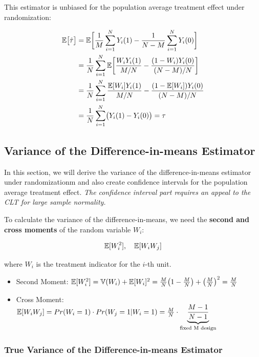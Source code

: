 This estimator is unbiased for the population average treatment effect under randomization:

\begin{align}
    {\mathbb{E}}\bigl[\hat\tau\bigr] &= \mathbb{E}\biggl[\frac{1}{M}\sum_{i=1}^N Y_i(1) - \frac{1}{N-M}\sum_{i=1}^N Y_i(0)\biggr]\\
    &= \frac{1}{N} \sum_{i=1}^N {\mathbb{E}}\biggl[\frac{W_iY_i(1)}{M/N} - \frac{(1-W_i)Y_i(0)}{(N-M)/N}\biggr]\\
    &= \frac{1}{N}\sum_{i=1}^N \frac{{\mathbb{E}}[W_i]Y_i(1)}{M/N} - \frac{(1-{\mathbb{E}}[W_i])Y_i(0)}{(N-M)/N}\\
    &= \frac{1}{N}\sum_{i=1}^N \bigl(Y_i(1) - Y_i(0)\bigr) = \tau
\end{align}


\subsection{Variance of the Difference-in-means Estimator}

In this section, we will derive the variance of the difference-in-means estimator under randomizationm and also create confidence intervals for the population average treatment effect.
\textit{The confidence interval part requires an appeal to the CLT for large sample normality.}

To calculate the variance of the difference-in-means, we need the \textbf{second and cross moments} of the random variable $W_i$:

\begin{align}
    {\mathbb{E}}[W_i^2], \quad {\mathbb{E}}[W_iW_j] 
\end{align}

where $W_i$ is the treatment indicator for the $i$-th unit.

\begin{itemize}
    \item Second Moment: ${\mathbb{E}}[W_i^2] = {\mathbb{V}}(W_i) + {\mathbb{E}}[W_i]^2 = \frac{M}{N}\bigl(1-\frac{M}{N}\bigr) + \left(\frac{M}{N}\right)^2 = \frac{M}{N}$
    \item Cross Moment: ${\mathbb{E}}[W_iW_j] = Pr(W_i=1)\cdot Pr(W_j=1|W_i=1) = \frac{M}{N}\cdot\underbrace{\frac{M-1}{N-1}}_\text{fixed M design}$
\end{itemize}

\subsubsection{True Variance of the Difference-in-means Estimator}

